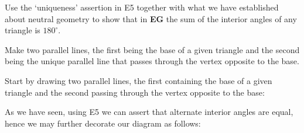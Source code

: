 \documentclass[newpage,hints,handout]{ximera}
\begin{document}
\begin{problem}
Use the `uniqueness' assertion in E5 together with what we have
established about neutral geometry to show that in \textbf{EG} the sum
of the interior angles of any triangle is $180^\circ$.

\begin{hint}
Make two parallel lines, the first being the base of a given triangle
and the second being the unique parallel line that passes through the
vertex opposite to the base.
\end{hint}
\begin{freeResponse}
Start by drawing two parallel lines, the first containing the base of a
given triangle and the second passing through the vertex opposite to
the base:
\begin{image}
\end{image}
As we have seen, using E5 we can assert that alternate interior angles
are equal, hence we may further decorate our diagram as follows: 
\begin{image}
\end{image}
\end{freeResponse}
\end{problem}
\end{document}
